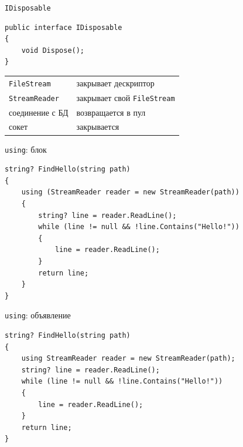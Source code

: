 \documentclass[aspectratio=169,10pt,t]{beamer}
\newcommand{\codesm}{\ttfamily\fontsize{7.6}{9.0}\selectfont}
\begin{document}
\begin{frame}[fragile]{\texttt{IDisposable}}
  \slidetop

\begin{lstlisting}[style=csharp,basicstyle=\ttfamily\small]
public interface IDisposable
{
    void Dispose();
}
\end{lstlisting}

  \slidegap
  {\renewcommand{\arraystretch}{1.35}\small
  \begin{tabular}{@{}p{3.6cm}p{7cm}@{}}
    \texttt{FileStream}  & закрывает дескриптор \\
    \texttt{StreamReader} & закрывает свой \texttt{FileStream} \\
    соединение с БД       & возвращается в пул \\
    сокет                 & закрывается \\
  \end{tabular}}
\end{frame}

\begin{frame}[fragile]{\texttt{using}: блок}
  \slidetop

\begin{lstlisting}[style=csharp,basicstyle=\codesm]
string? FindHello(string path)
{
    using (StreamReader reader = new StreamReader(path))
    {
        string? line = reader.ReadLine();
        while (line != null && !line.Contains("Hello!"))
        {
            line = reader.ReadLine();
        }
        return line;
    }
}
\end{lstlisting}

  \slidegap
\end{frame}

\begin{frame}[fragile]{\texttt{using}: объявление}
  \slidetop

\begin{lstlisting}[style=csharp,basicstyle=\codesm]
string? FindHello(string path)
{
    using StreamReader reader = new StreamReader(path);
    string? line = reader.ReadLine();
    while (line != null && !line.Contains("Hello!"))
    {
        line = reader.ReadLine();
    }
    return line;
}
\end{lstlisting}

  \slidegap
\end{frame}
\end{document}
